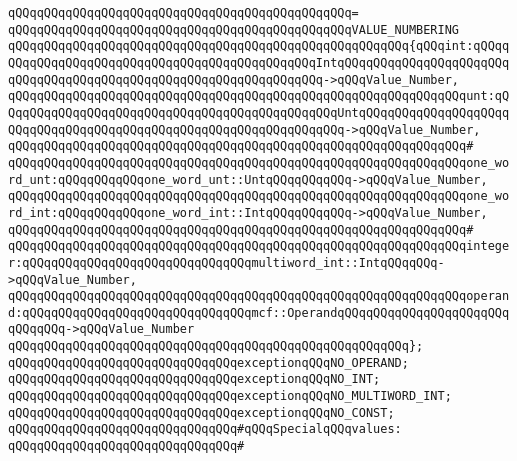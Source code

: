 \verb|qQQqqQQqqQQqqQQqqQQqqQQqqQQqqQQqqQQqqQQqqQQqqQQq=|\newline
\verb|qQQqqQQqqQQqqQQqqQQqqQQqqQQqqQQqqQQqqQQqqQQqqQQqVALUE_NUMBERING|\newline
\verb|qQQqqQQqqQQqqQQqqQQqqQQqqQQqqQQqqQQqqQQqqQQqqQQqqQQqqQQq{qQQqint:qQQqqQQqqQQqqQQqqQQqqQQqqQQqqQQqqQQqqQQqqQQqqQQqIntqQQqqQQqqQQqqQQqqQQqqQQqqQQqqQQqqQQqqQQqqQQqqQQqqQQqqQQqqQQqqQQqqQQq->qQQqValue_Number,|\newline
\verb|qQQqqQQqqQQqqQQqqQQqqQQqqQQqqQQqqQQqqQQqqQQqqQQqqQQqqQQqqQQqqQQqunt:qQQqqQQqqQQqqQQqqQQqqQQqqQQqqQQqqQQqqQQqqQQqqQQqUntqQQqqQQqqQQqqQQqqQQqqQQqqQQqqQQqqQQqqQQqqQQqqQQqqQQqqQQqqQQqqQQqqQQq->qQQqValue_Number,|\newline
\verb|qQQqqQQqqQQqqQQqqQQqqQQqqQQqqQQqqQQqqQQqqQQqqQQqqQQqqQQqqQQqqQQq#|\newline
\verb|qQQqqQQqqQQqqQQqqQQqqQQqqQQqqQQqqQQqqQQqqQQqqQQqqQQqqQQqqQQqqQQqone_word_unt:qQQqqQQqqQQqone_word_unt::UntqQQqqQQqqQQq->qQQqValue_Number,|\newline
\verb|qQQqqQQqqQQqqQQqqQQqqQQqqQQqqQQqqQQqqQQqqQQqqQQqqQQqqQQqqQQqqQQqone_word_int:qQQqqQQqqQQqone_word_int::IntqQQqqQQqqQQq->qQQqValue_Number,|\newline
\verb|qQQqqQQqqQQqqQQqqQQqqQQqqQQqqQQqqQQqqQQqqQQqqQQqqQQqqQQqqQQqqQQq#|\newline
\verb|qQQqqQQqqQQqqQQqqQQqqQQqqQQqqQQqqQQqqQQqqQQqqQQqqQQqqQQqqQQqqQQqinteger:qQQqqQQqqQQqqQQqqQQqqQQqqQQqqQQqmultiword_int::IntqQQqqQQq->qQQqValue_Number,|\newline
\verb|qQQqqQQqqQQqqQQqqQQqqQQqqQQqqQQqqQQqqQQqqQQqqQQqqQQqqQQqqQQqqQQqoperand:qQQqqQQqqQQqqQQqqQQqqQQqqQQqqQQqmcf::OperandqQQqqQQqqQQqqQQqqQQqqQQqqQQqqQQq->qQQqValue_Number|\newline
\verb|qQQqqQQqqQQqqQQqqQQqqQQqqQQqqQQqqQQqqQQqqQQqqQQqqQQqqQQq};|\newline
\newline
\verb|qQQqqQQqqQQqqQQqqQQqqQQqqQQqqQQqexceptionqQQqNO_OPERAND;|\newline
\verb|qQQqqQQqqQQqqQQqqQQqqQQqqQQqqQQqexceptionqQQqNO_INT;|\newline
\verb|qQQqqQQqqQQqqQQqqQQqqQQqqQQqqQQqexceptionqQQqNO_MULTIWORD_INT;|\newline
\verb|qQQqqQQqqQQqqQQqqQQqqQQqqQQqqQQqexceptionqQQqNO_CONST;|\newline
\newline
\verb|qQQqqQQqqQQqqQQqqQQqqQQqqQQqqQQq#qQQqSpecialqQQqvalues:|\newline
\verb|qQQqqQQqqQQqqQQqqQQqqQQqqQQqqQQq#|\newline
